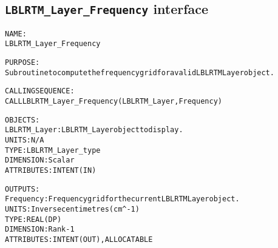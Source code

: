 \subsection{\texttt{LBLRTM\_Layer\_Frequency} interface}
  \label{sec:LBLRTM_Layer_Frequency_interface}
  \begin{alltt}
 
  NAME:
        LBLRTM_Layer_Frequency
 
  PURPOSE:
        Subroutine to compute the frequency grid for a valid LBLRTM Layer object.
 
  CALLING SEQUENCE:
        CALL LBLRTM_Layer_Frequency( LBLRTM_Layer, Frequency )
 
  OBJECTS:
        LBLRTM_Layer:  LBLRTM_Layer object to display.
                       UNITS:      N/A
                       TYPE:       LBLRTM_Layer_type
                       DIMENSION:  Scalar
                       ATTRIBUTES: INTENT(IN)
 
  OUTPUTS:
        Frequency:     Frequency grid for the current LBLRTM Layer object.
                       UNITS:      Inverse centimetres (cm^-1)
                       TYPE:       REAL(DP)
                       DIMENSION:  Rank-1
                       ATTRIBUTES: INTENT(OUT), ALLOCATABLE
 
  \end{alltt}
